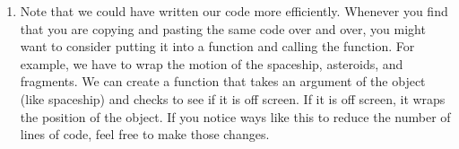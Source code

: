 \begin{enumerate}
\item Note that we could have written our code more efficiently. Whenever you find that you are copying and pasting the same code over and over, you might want to consider putting it into a function and calling the function. For example, we have to wrap the motion of the spaceship, asteroids, and fragments. We can create a  function that takes an argument of the object (like spaceship) and checks to see if it is off screen. If it is off screen, it wraps the position of the object. If you notice ways like this to reduce the number of lines of code, feel free to make those changes.

\end{enumerate}

\pagebreak

\analysis

